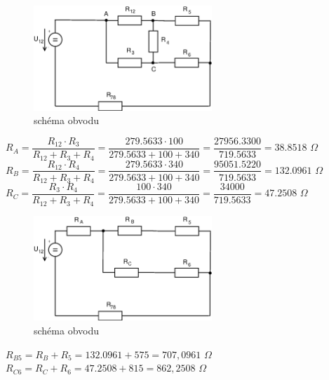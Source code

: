 \documentclass[10pt,a4paper]{article}
\begin{document}
   \begin{figure}[ht]
    \begin{center}
     \includegraphics[width=0.6\textwidth]{2018.eps}
      \caption{schéma obvodu}
    \end{center}
   \end{figure}
   \newpage
   
    
    \begin{center}
     \begin{large}
      $ R_A = \dfrac{R_{12} \cdot {R_3}}{R_{12}+R_3+R_4} = \dfrac{279.5633 \cdot100}{279.5633+100+340} = \dfrac{27956.3300}{719.5633} = 38.8518 $  $\Omega$
      \\[6pt]
      $ R_B = \dfrac{R_{12} \cdot {R_4}}{R_{12}+R_3+R_4} = \dfrac{279.5633 \cdot340}{279.5633+100+340} = \dfrac{95051.5220}{719.5633} = 132.0961 $  $\Omega$
      \\[6pt]
      $ R_C = \dfrac{R_3 \cdot {R_4}}{R_{12}+R_3+R_4} = \dfrac{100 \cdot340}{279.5633+100+340} = \dfrac{34000}{719.5633} = 47.2508 $  $\Omega$
      \\[20pt]
   \end{large}
  \end{center} 
  
   \begin{figure}[ht]
    \begin{center}
     \includegraphics[width=0.6\textwidth]{2019.eps}
      \caption{schéma obvodu}
    \end{center}
   \end{figure} 

    \begin{center}
     \begin{large}
      $ R_{B5} = R_B+R_5 = 132.0961+575 = 707,0961 $  $\Omega$
      \\[6pt]
      $ R_{C6} = R_C+R_6 = 47.2508+815 = 862,2508 $  $\Omega$
      \\[20pt]    
   \end{large}
  \end{center} 
  
\end{document}

